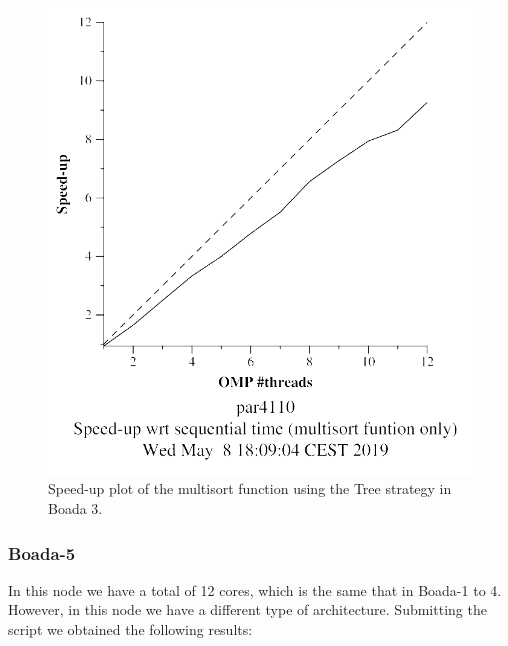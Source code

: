 \documentclass[12pt, a4paper]{article}
\begin{document}
\begin{figure}[H]
\begin{minipage}[b]{0.4\linewidth}
  \includegraphics[scale=0.5]{./images/S2/S2_strong_scalability/multisort-omp-strong_boada-3_tree_multisort_only}
  \caption{Speed-up plot of the multisort function using the Tree strategy in Boada 3.}
  \label{fig:mandel-omp-10000-strong-21-speedup}
\end{minipage}
\end{figure}

\subsubsection{Boada-5}

In this node we have a total of 12 cores, which is the same that in Boada-1 to 4. However, in this node we have a different type of architecture. Submitting the script we obtained the following results:
\end{document}
